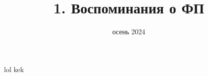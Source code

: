 
\newif\ifhandout




\title[1. Воспоминания о ФП]{1. Воспоминания о ФП}
\date{осень 2024}



    \setcounter{framenumber}{-1}
    \maketitle

    \begin{frame}[fragile]{lol}
        kek
    \end{frame}


